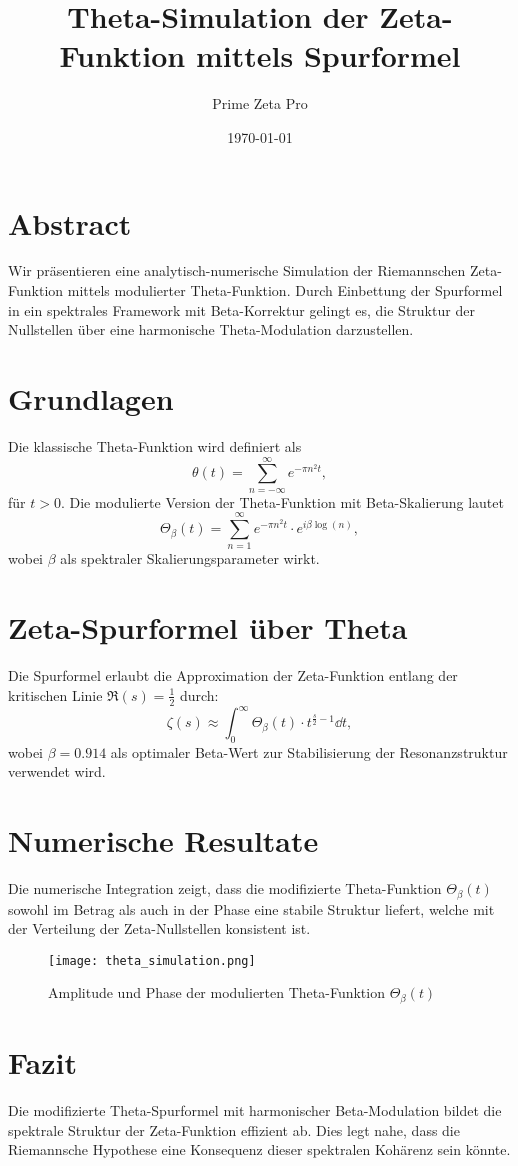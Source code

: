 \documentclass[12pt]{article}
\title{Theta-Simulation der Zeta-Funktion mittels Spurformel}
\author{Prime Zeta Pro}
\date{\today}
\begin{document}
\maketitle

\section*{Abstract}
Wir präsentieren eine analytisch-numerische Simulation der Riemannschen Zeta-Funktion mittels modulierter Theta-Funktion. Durch Einbettung der Spurformel in ein spektrales Framework mit Beta-Korrektur gelingt es, die Struktur der Nullstellen über eine harmonische Theta-Modulation darzustellen.

\section{Grundlagen}
Die klassische Theta-Funktion wird definiert als
\begin{equation}
    \theta(t) = \sum_{n=-\infty}^{\infty} e^{-\pi n^2 t},
\end{equation}
für $t > 0$. Die modulierte Version der Theta-Funktion mit Beta-Skalierung lautet
\begin{equation}
    \Theta_{\beta}(t) = \sum_{n=1}^{\infty} e^{-\pi n^2 t} \cdot e^{i \beta \log(n)},
\end{equation}
wobei $\beta$ als spektraler Skalierungsparameter wirkt.

\section{Zeta-Spurformel über Theta}
Die Spurformel erlaubt die Approximation der Zeta-Funktion entlang der kritischen Linie $\Re(s) = \frac{1}{2}$ durch:
\begin{equation}
    \zeta(s) \approx \int_{0}^{\infty} \Theta_{\beta}(t) \cdot t^{\frac{s}{2} - 1} \dd{t},
\end{equation}
wobei $\beta = 0.914$ als optimaler Beta-Wert zur Stabilisierung der Resonanzstruktur verwendet wird.

\section{Numerische Resultate}
Die numerische Integration zeigt, dass die modifizierte Theta-Funktion $\Theta_{\beta}(t)$ sowohl im Betrag als auch in der Phase eine stabile Struktur liefert, welche mit der Verteilung der Zeta-Nullstellen konsistent ist.

\begin{figure}[h!]
    \centering
    \texttt{[image: theta\_simulation.png]}
    \caption{Amplitude und Phase der modulierten Theta-Funktion $\Theta_{\beta}(t)$}
\end{figure}

\section{Fazit}
Die modifizierte Theta-Spurformel mit harmonischer Beta-Modulation bildet die spektrale Struktur der Zeta-Funktion effizient ab. Dies legt nahe, dass die Riemannsche Hypothese eine Konsequenz dieser spektralen Kohärenz sein könnte.
\end{document}

